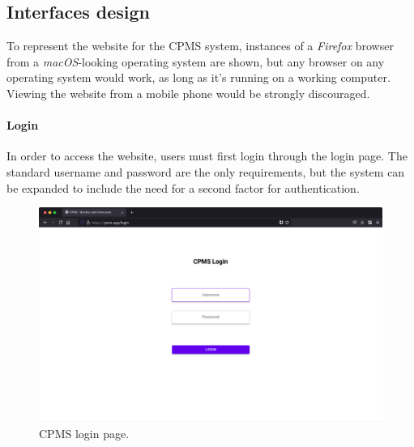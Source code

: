 \subsection{Interfaces design}

To represent the website for the CPMS system, instances of a \textit{Firefox} browser from a \textit{macOS}-looking operating system are shown, but any browser on any operating system would work, as long as it's running on a working computer. Viewing the website from a mobile phone would be strongly discouraged. 

\paragraph{Login} In order to access the website, users must first login through the login page. The standard username and password are the only requirements, but the system can be expanded to include the need for a second factor for authentication.

\bigskip
\bigskip
\bigskip
\bigskip

\begin{figure}[h!]
    \centering
    \includegraphics[width=\columnwidth]{./images/mockups/cpms/login}
    \caption{CPMS login page.}
\end{figure}

\pagebreak


